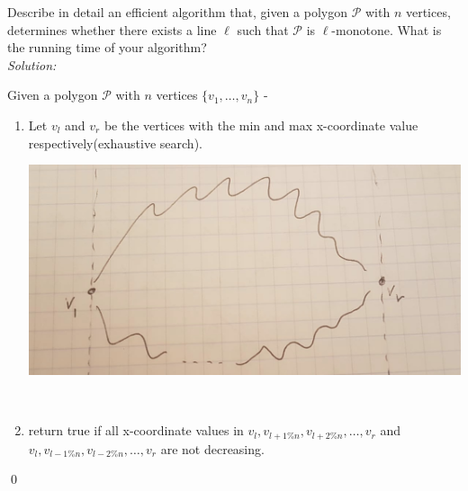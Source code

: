 \documentclass[a4paper, 8pt, oneside]{article}
\newenvironment{sol}
    {\emph{Solution:}
    }
    {
    \qed
    }
\begin{document}
\begin{enumerate}
Describe in detail an efficient algorithm that, given a polygon $\mathcal{P}$ with $n$ vertices, determines whether there exists a line $\ell$ such that $\mathcal{P}$ is $\ell$-monotone. What is the running time of your algorithm?\\

\begin{sol}
Given a polygon $\mathcal{P}$ with $n$ vertices $\{v_1, \ldots, v_n \}$ - \\

 \begin{enumerate}
   \item  \label{itm:setp1}  Let $v_l$ and $v_r$ be the  vertices with the min and max  x-coordinate value  respectively(exhaustive search).\\
         \begin{minipage}{\linewidth}
            \centering
            \includegraphics[scale=0.2]{chanis}
        \end{minipage} \\
\item \label{itm:setp2} return true if all  x-coordinate values in  $v_l, v_{l+1\%n}, v_{l+2\%n}, \ldots, v_r$ and $v_l, v_{l-1\%n}, v_{l-2\%n}, \ldots, v_r$ are not decreasing.\\


\end{enumerate}
\end{sol}
\end{enumerate}
\end{document}
